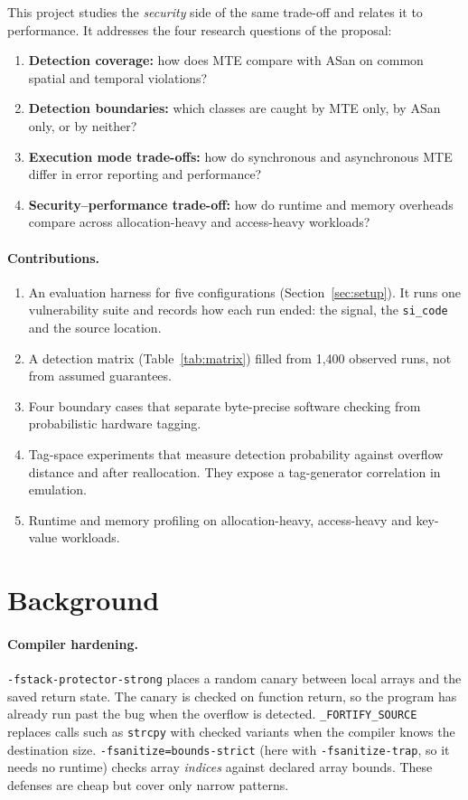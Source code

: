 \documentclass[11pt,a4paper]{article}
\begin{document}
This project studies the \emph{security} side of the same trade-off and relates it to performance.
It addresses the four research questions of the proposal:
\begin{enumerate}[label=\textbf{RQ\arabic*},leftmargin=3em,itemsep=1pt]
\item \textbf{Detection coverage:} how does MTE compare with ASan on common spatial and temporal violations?
\item \textbf{Detection boundaries:} which classes are caught by MTE only, by ASan only, or by neither?
\item \textbf{Execution mode trade-offs:} how do synchronous and asynchronous MTE differ in error reporting and performance?
\item \textbf{Security--performance trade-off:} how do runtime and memory overheads compare across allocation-heavy and access-heavy workloads?
\end{enumerate}

\paragraph{Contributions.}
\begin{enumerate}[itemsep=1pt]
\item An evaluation harness for five configurations (Section~\ref{sec:setup}).
It runs one vulnerability suite and records how each run ended: the signal, the \texttt{si\_code} and the source location.
\item A detection matrix (Table~\ref{tab:matrix}) filled from 1{,}400 observed runs, not from assumed guarantees.
\item Four boundary cases that separate byte-precise software checking from probabilistic hardware tagging.
\item Tag-space experiments that measure detection probability against overflow distance and after reallocation.
They expose a tag-generator correlation in emulation.
\item Runtime and memory profiling on allocation-heavy, access-heavy and key-value workloads.
\end{enumerate}

\section{Background}
\label{sec:bg}
\paragraph{Compiler hardening.}
\texttt{-fstack-protector-strong} places a random canary between local arrays and the saved return state.
The canary is checked on function return, so the program has already run past the bug when the overflow is detected.
\texttt{\_FORTIFY\_SOURCE} replaces calls such as \texttt{strcpy} with checked variants when the compiler knows the destination size.
\texttt{-fsanitize=bounds-strict} (here with \texttt{-fsanitize-trap}, so it needs no runtime) checks array \emph{indices} against declared array bounds.
These defenses are cheap but cover only narrow patterns.
\end{document}
